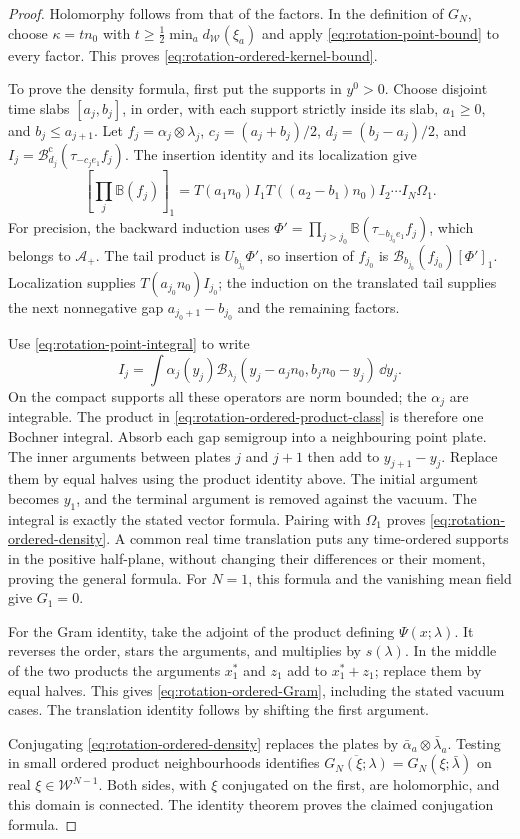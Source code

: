 \begin{proof}
Holomorphy follows from that of the factors. In the definition of
$G_N$, choose $\kappa=tn_0$ with
$t\ge\frac12\min_a d_{\mathcal W}(\xi_a)$ and apply
\eqref{eq:rotation-point-bound} to every factor. This proves
\eqref{eq:rotation-ordered-kernel-bound}.

To prove the density formula, first put the supports in $y^0>0$.
Choose disjoint time slabs $[a_j,b_j]$, in order, with each support
strictly inside its slab, $a_1\ge0$, and $b_j\le a_{j+1}$.
Let $f_j=\alpha_j\otimes\lambda_j$,
$c_j=(a_j+b_j)/2$, $d_j=(b_j-a_j)/2$, and
$I_j=\mathcal B_{d_j}^{\mathrm c}(\tau_{-c_je_1}f_j)$.
The insertion identity and its localization give
\begin{equation}\label{eq:rotation-ordered-product-class}
 \left[\prod_j\mathbb B(f_j)\right]_1
 =T(a_1n_0)I_1T((a_2-b_1)n_0)I_2\cdots I_N\Omega_1.
\end{equation}
For precision, the backward induction uses
$\Phi'=\prod_{j>j_0}\mathbb B(\tau_{-b_{j_0}e_1}f_j)$,
which belongs to $\mathcal A_+$.
The tail product is $U_{b_{j_0}}\Phi'$, so insertion of $f_{j_0}$
is $\mathcal B_{b_{j_0}}(f_{j_0})[\Phi']_1$.
Localization supplies $T(a_{j_0}n_0)I_{j_0}$; the induction
on the translated tail supplies the next nonnegative gap
$a_{j_0+1}-b_{j_0}$ and the remaining factors.

Use \eqref{eq:rotation-point-integral} to write
\[
 I_j=\int\alpha_j(y_j)
       \mathcal B_{\lambda_j}(y_j-a_jn_0,b_jn_0-y_j)\,\dd y_j.
\]
On the compact supports all these operators are norm bounded;
the $\alpha_j$ are integrable. The product in
\eqref{eq:rotation-ordered-product-class} is therefore one Bochner
integral. Absorb each gap semigroup into a neighbouring point plate.
The inner arguments between plates $j$ and $j+1$ then add to
$y_{j+1}-y_j$. Replace them by equal halves using the product
identity above. The initial argument becomes $y_1$, and the
terminal argument is removed against the vacuum. The integral is
exactly the stated vector formula. Pairing with $\Omega_1$ proves
\eqref{eq:rotation-ordered-density}.
A common real time translation puts any time-ordered supports in
the positive half-plane, without changing their differences or
their moment, proving the general formula.
For $N=1$, this formula and the vanishing mean field give $G_1=0$.

For the Gram identity, take the adjoint of the product defining
$\Psi(x;\lambda)$. It reverses the order, stars the arguments,
and multiplies by $s(\lambda)$. In the middle of the two products
the arguments $x_1^*$ and $z_1$ add to $x_1^*+z_1$; replace them
by equal halves. This gives
\eqref{eq:rotation-ordered-Gram}, including the stated vacuum cases.
The translation identity follows by shifting the first argument.

Conjugating \eqref{eq:rotation-ordered-density} replaces the plates
by $\bar\alpha_a\otimes\bar\lambda_a$. Testing in small ordered
product neighbourhoods identifies
$\overline{G_N(\xi;\lambda)}=G_N(\xi;\bar\lambda)$ on real
$\xi\in\mathcal W^{N-1}$. Both sides, with $\xi$ conjugated on
the first, are holomorphic, and this domain is connected.
The identity theorem proves the claimed conjugation formula.
\end{proof}

